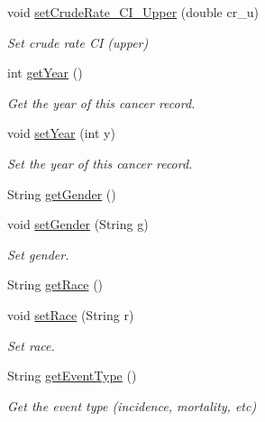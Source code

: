 \begin{DoxyCompactItemize}
void \mbox{\hyperlink{classbridges_1_1data__src__dependent_1_1_cancer_incidence_a99e25dd53093badf350b06b7e0c8b725}{set\+Crude\+Rate\+\_\+\+C\+I\+\_\+\+Upper}} (double cr\+\_\+u)
\begin{DoxyCompactList}\small\item\em Set crude rate CI (upper) \end{DoxyCompactList}\item 
int \mbox{\hyperlink{classbridges_1_1data__src__dependent_1_1_cancer_incidence_aaff714019154afa796d54ed57ffc9492}{get\+Year}} ()
\begin{DoxyCompactList}\small\item\em Get the year of this cancer record. \end{DoxyCompactList}\item 
void \mbox{\hyperlink{classbridges_1_1data__src__dependent_1_1_cancer_incidence_aa5524736b76d67f1248d1a05d9f596a9}{set\+Year}} (int y)
\begin{DoxyCompactList}\small\item\em Set the year of this cancer record. \end{DoxyCompactList}\item 
String \mbox{\hyperlink{classbridges_1_1data__src__dependent_1_1_cancer_incidence_a2c3cbe65d89827c167f15314b8b088b3}{get\+Gender}} ()
\item 
void \mbox{\hyperlink{classbridges_1_1data__src__dependent_1_1_cancer_incidence_a217681578e13197e1d177932c73ea80f}{set\+Gender}} (String g)
\begin{DoxyCompactList}\small\item\em Set gender. \end{DoxyCompactList}\item 
String \mbox{\hyperlink{classbridges_1_1data__src__dependent_1_1_cancer_incidence_a18de1c14d36cd7656555c8465ea8a009}{get\+Race}} ()
\item 
void \mbox{\hyperlink{classbridges_1_1data__src__dependent_1_1_cancer_incidence_a8c26c4358561453f3d2ca3a463eed872}{set\+Race}} (String r)
\begin{DoxyCompactList}\small\item\em Set race. \end{DoxyCompactList}\item 
String \mbox{\hyperlink{classbridges_1_1data__src__dependent_1_1_cancer_incidence_a844c6c3317bdb6b124f32b40804e1ff7}{get\+Event\+Type}} ()
\begin{DoxyCompactList}\small\item\em Get the event type (incidence, mortality, etc) \end{DoxyCompactList}\item 

\end{DoxyCompactItemize}
